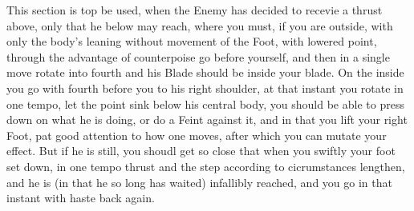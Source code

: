 
This section is top be used, when the Enemy has decided to recevie a
thrust above, only that he below may reach, where you must, if you are
outside, with only the body's leaning without movement of the Foot,
with lowered point, through the advantage of counterpoise go before
yourself, and then in a single move rotate into fourth and his Blade
should be inside your blade. On the inside you go with fourth before
you to his right shoulder, at that instant you rotate in one tempo,
let the point sink below his central body, you should be able to press down on
what he is doing, or do a Feint against it, and in that you lift your
right Foot, pat good attention to how one moves, after which you can
mutate your effect. But if he is still, you shoudl get so close that
when you swiftly your foot set down, in one tempo thrust and the step
according to cicrumstances lengthen, and he is (in that he so long has
waited) infallibly reached, and you go in that instant with haste back
again.
